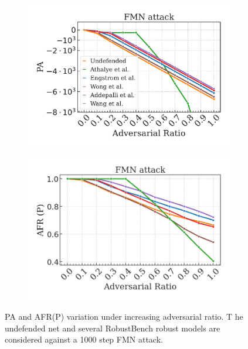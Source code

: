 \begin{figure}[H]
    \centering
    \begin{subfigure}[b]{0.45\textwidth}
        \centering
        \includegraphics[width=\textwidth]{img/results_discussion/adversarial/FMN.pdf}
    \end{subfigure}
    \begin{subfigure}[b]{0.45\textwidth}
        \centering
        \includegraphics[width=\textwidth]{img/results_discussion/adversarial/FMN_1000_AFR_pred.png}
    \end{subfigure}

    \caption{PA and AFR(P) variation under increasing adversarial ratio. T
    he undefended net and several RobustBench robust models are considered 
    against a 1000 step FMN attack.}
    \label{fig:appendix_adversarial_afrpred_fmn}
\end{figure}

